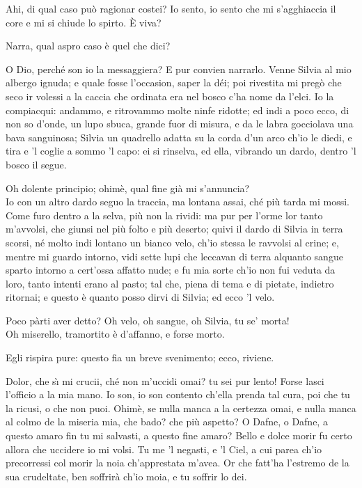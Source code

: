 \documentclass{book}
\begin{document}
   \4 Ahi, di qual caso
	pu\`o ragionar costei? Io sento, io sento
	che mi s'agghiaccia il core e mi si chiude
	lo spirto. \`E viva?

	\2 Narra, qual aspro caso \`e quel che dici?

	\7 O Dio, perch\'e son io
	la messaggiera? E pur convien narrarlo.
	Venne Silvia al mio albergo ignuda; e quale
	fosse l'occasion, saper la d\'ei;
	poi rivestita mi preg\`o che seco
	ir volessi a la caccia che ordinata
	era nel bosco c'ha nome da l'elci.
	Io la compiacqui: andammo, e ritrovammo
	molte ninfe ridotte; ed indi a poco
	ecco, di non so d'onde, un lupo sbuca,
	grande fuor di misura, e da le labra
	gocciolava una bava sanguinosa;
	Silvia un quadrello adatta su la corda
	d'un arco ch'io le diedi, e tira e 'l coglie
	a sommo 'l capo: ei si rinselva, ed ella,
	vibrando un dardo, dentro 'l bosco il segue.

	\4 Oh dolente principio; ohim\`e, qual fine
	gi\`a mi s'annuncia? \\

   \7 Io con un altro dardo
	seguo la traccia, ma lontana assai,
	ch\'e pi\`u tarda mi mossi. Come furo
	dentro a la selva, pi\`u non la rividi:
	ma pur per l'orme lor tanto m'avvolsi,
	che giunsi nel pi\`u folto e pi\`u deserto;
	quivi il dardo di Silvia in terra scorsi,
	n\'e molto indi lontano un bianco velo,
	ch'io stessa le ravvolsi al crine; e, mentre
	mi guardo intorno, vidi sette lupi
	che leccavan di terra alquanto sangue
	sparto intorno a cert'ossa affatto nude;
	e fu mia sorte ch'io non fui veduta
	da loro, tanto intenti erano al pasto;
	tal che, piena di tema e di pietate,
	indietro ritornai; e questo \`e quanto
	posso dirvi di Silvia; ed ecco 'l velo.

	\4 Poco p\`arti aver detto? Oh velo, oh sangue,
	oh Silvia, tu se' morta! \\

   \2 Oh miserello,
	tramortito \`e d'affanno, e forse morto.

	\7 Egli rispira pure: questo fia
	un breve svenimento; ecco, riviene.

	\4 Dolor, che s\`{\i} mi crucii,
	ch\'e non m'uccidi omai? tu sei pur lento!
	Forse lasci l'officio a la mia mano.
	Io son, io son contento
	ch'ella prenda tal cura,
	poi che tu la ricusi, o che non puoi.
	Ohim\`e, se nulla manca
	a la certezza omai,
	e nulla manca al colmo
	de la miseria mia,
	che bado? che pi\`u aspetto? O Dafne, o Dafne,
	a questo amaro fin tu mi salvasti,
	a questo fine amaro?
	Bello e dolce morir fu certo allora
	che uccidere io mi volsi.
	Tu me 'l negasti, e 'l Ciel, a cui parea
	ch'io precorressi col morir la noia
	ch'apprestata m'avea.
	Or che fatt'ha l'estremo
	de la sua crudeltate,
	ben soffrir\`a ch'io moia,
	e tu soffrir lo dei.
\end{document}
